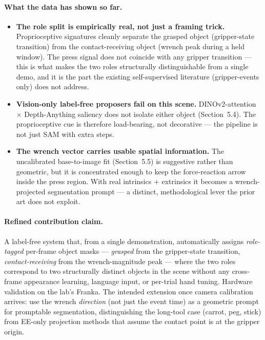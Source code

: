 \documentclass[11pt]{article}
\begin{document}
\paragraph{What the data has shown so far.}
\begin{itemize}[noitemsep]
  \item \textbf{The role split is empirically real, not just a framing
        trick.} Proprioceptive signatures cleanly separate the grasped
        object (gripper-state transition) from the contact-receiving
        object (wrench peak during a held window). The press signal does
        not coincide with any gripper transition --- this is what makes
        the two roles structurally distinguishable from a single demo,
        and it is the part the existing self-supervised literature
        (gripper-events only) does not address.
  \item \textbf{Vision-only label-free proposers fail on this scene.}
        DINOv2-attention $\times$ Depth-Anything saliency does not isolate
        either object (Section~5.4). The proprioceptive cue is therefore
        load-bearing, not decorative --- the pipeline is not just SAM
        with extra steps.
  \item \textbf{The wrench vector carries usable spatial information.}
        The uncalibrated base-to-image fit (Section~5.5) is suggestive
        rather than geometric, but it is concentrated enough to keep the
        force-reaction arrow inside the press region. With real
        intrinsics + extrinsics it becomes a wrench-projected segmentation
        prompt --- a distinct, methodological lever the prior art does
        not exploit.
\end{itemize}

\paragraph{Refined contribution claim.} A label-free system that, from a
single demonstration, automatically assigns \emph{role-tagged} per-frame
object masks --- \textit{grasped} from the gripper-state transition,
\textit{contact-receiving} from the wrench-magnitude peak --- where the
two roles correspond to two structurally distinct objects in the scene
without any cross-frame appearance learning, language input, or per-trial
hand tuning. Hardware validation on the lab's Franka. The intended
extension once camera calibration arrives: use the wrench \emph{direction}
(not just the event time) as a geometric prompt for promptable
segmentation, distinguishing the long-tool case (carrot, peg, stick)
from EE-only projection methods that assume the contact point is at the
gripper origin.
\end{document}

